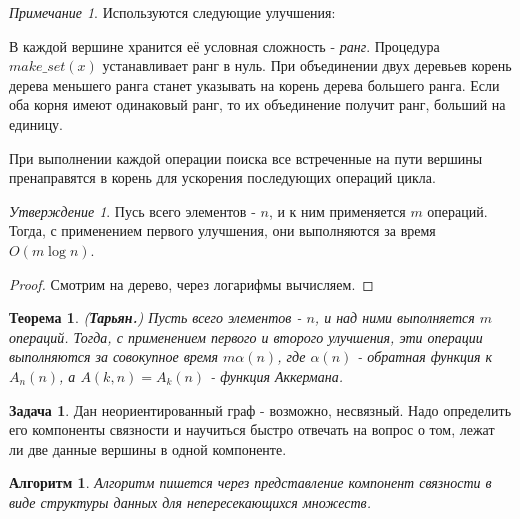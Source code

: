 \documentclass[a4paper]{article}
\theoremstyle{indented}
\newtheorem{theorem}{Теорема}
\newtheorem{alg}{Алгоритм}
\theoremstyle{definition}
\newtheorem{prob}{Задача}
\theoremstyle{remark}
\newtheorem{remark}{Примечание}
\newtheorem{stat}{Утверждение}
\begin{document}
\begin{remark}
    Используются следующие улучшения: \ 
    
    В каждой вершине хранится её условная сложность - \textit{ранг}. Процедура $make\_set(x)$ устанавливает ранг в нуль. При объединении двух деревьев корень дерева меньшего ранга станет указывать на корень дерева большего ранга. Если оба корня имеют одинаковый ранг, то их объединение получит ранг, больший на единицу. \ 

    При выполнении каждой операции поиска все встреченные на пути вершины пренаправятся в корень для ускорения последующих операций цикла.
\end{remark}

\begin{stat}
    Пусь всего элементов - $n$, и к ним применяется $m$ операций. Тогда, с применением первого улучшения, они выполняются за время $O(m \log n)$. 
\end{stat}

\begin{proof}
    Смотрим на дерево, через логарифмы вычисляем.
\end{proof}

\begin{theorem}
    (\textbf{Тарьян.}) Пусть всего элементов - $n$, и над ними выполняется $m$ операций. Тогда, с применением первого и второго улучшения, эти операции выполняются за совокупное время $m\alpha (n)$, где $\alpha(n)$ - обратная функция к $A_n(n)$, а $A(k, n)=A_k(n)$ - \textit{функция Аккермана}. 
\end{theorem}

\begin{prob}
    Дан неориентированный граф - возможно, несвязный. Надо определить его компоненты связности и научиться быстро отвечать на вопрос о том, лежат ли две данные вершины в одной компоненте.
\end{prob}

\begin{alg}
    Алгоритм пишется через представление компонент связности в виде структуры данных для непересекающихся множеств.
\end{alg}
\end{document}
